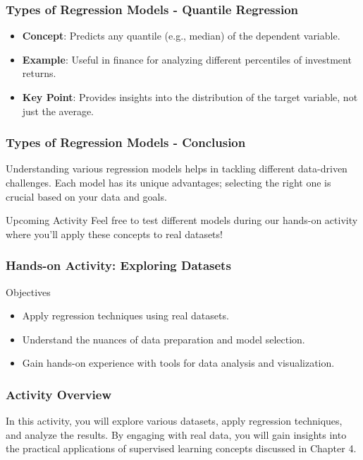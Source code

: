 \documentclass[aspectratio=169]{beamer}
\begin{document}
\begin{frame}[fragile]
    \frametitle{Types of Regression Models - Quantile Regression}
    \begin{itemize}
        \item \textbf{Concept}: Predicts any quantile (e.g., median) of the dependent variable.
        
        \item \textbf{Example}: Useful in finance for analyzing different percentiles of investment returns.
        
        \item \textbf{Key Point}: Provides insights into the distribution of the target variable, not just the average.
    \end{itemize}
\end{frame}

\begin{frame}[fragile]
    \frametitle{Types of Regression Models - Conclusion}
    Understanding various regression models helps in tackling different data-driven challenges. Each model has its unique advantages; selecting the right one is crucial based on your data and goals.

    \begin{block}{Upcoming Activity}
        Feel free to test different models during our hands-on activity where you’ll apply these concepts to real datasets!
    \end{block}
\end{frame}

\begin{frame}[fragile]
    \frametitle{Hands-on Activity: Exploring Datasets}
    
    \begin{block}{Objectives}
        \begin{itemize}
            \item Apply regression techniques using real datasets.
            \item Understand the nuances of data preparation and model selection.
            \item Gain hands-on experience with tools for data analysis and visualization.
        \end{itemize}
    \end{block}
\end{frame}

\begin{frame}[fragile]
    \frametitle{Activity Overview}
    
    In this activity, you will explore various datasets, apply regression techniques, and analyze the results.
    By engaging with real data, you will gain insights into the practical applications of supervised learning concepts discussed in Chapter 4.
\end{frame}
\end{document}

